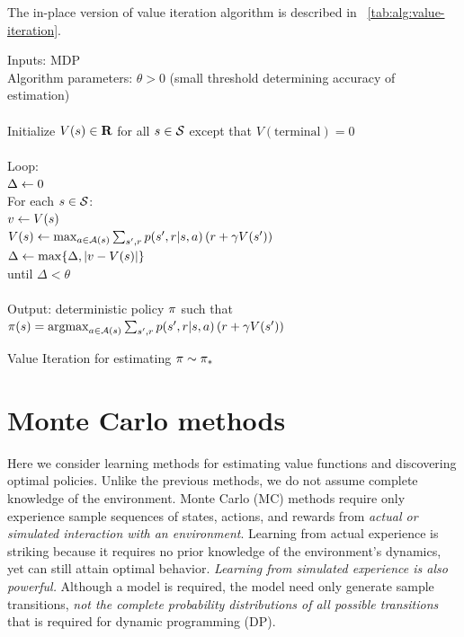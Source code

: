 The in-place version of value iteration algorithm is described in \tablename~\ref{tab:alg:value-iteration}.

\begin{table}
\beginalg
Inputs: MDP \\
Algorithm parameters: $\theta > 0$ (small threshold determining accuracy of estimation)\\
\\
Initialize $V(s) \in \mathbf{R}$ for all $s \in \mathcal{S}$ except that $V(\mathrm{terminal}) = 0$ \\
\\
Loop: \\
\> $\Delta \leftarrow 0$ \\
\> For each $s\in\mathcal{S}$: \\
\> \> $v\leftarrow V(s)$ \\
\> \> $V(s) \leftarrow \max_{a\in\mathcal{A}(s)} \sum_{{s'}, r} p({s'}, r|s,a) \left( r + \gamma V({s'}) \right)$ \\
\> \> $\Delta \leftarrow \max\{\Delta, |v-V(s)|\}$ \\
until $\Delta < \theta$\\
\\
Output: deterministic policy $\pi$ such that\\
\> $\pi(s) = \mathop{\mathrm {argmax}}_{a\in\mathcal{A}(s)} \sum_{{s'}, r} p({s'}, r|s,a) \left( r + \gamma V({s'}) \right)$
\endalg
\caption{Value Iteration for estimating $\pi \sim {\ensuremath{\pi}}_\ast$}
\label{tab:alg:value-iteration}
\end{table}



\section{Monte Carlo methods}

Here we consider learning methods for estimating value functions and discovering optimal policies.
Unlike the previous methods,
we do not assume complete knowledge of the environment.
Monte Carlo (MC) methods require only experience sample sequences of states, actions, and rewards
from \emph{actual or simulated interaction with an environment}.
Learning from actual experience is striking because it requires no prior knowledge of the environment’s dynamics,
yet can still attain optimal behavior.
\emph{Learning from simulated experience is also powerful.}
Although a model is required,
the model need only generate sample transitions,
\emph{not the complete probability distributions of all possible transitions} that is required for dynamic programming (DP).

